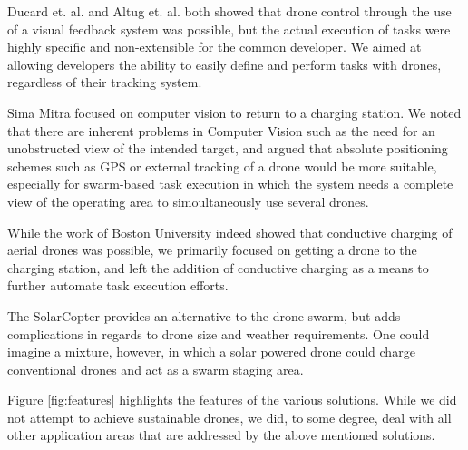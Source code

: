 Ducard et. al. and Altug et. al. both showed that drone control through the use of a visual feedback system was possible, but the actual execution of tasks were highly specific and non-extensible for the common developer. We aimed at allowing developers the ability to easily define and perform tasks with drones, regardless of their tracking system.

Sima Mitra focused on computer vision to return to a charging station. We noted that there are inherent problems in Computer Vision such as the need for an unobstructed view of the intended target, and argued that absolute positioning schemes such as GPS or external tracking of a drone would be more suitable, especially for swarm-based task execution in which the system needs a complete view of the operating area to simoultaneously use several drones.

While the work of Boston University indeed showed that conductive charging of aerial drones was possible, we primarily focused on getting a drone to the charging station, and left the addition of conductive charging as a means to further automate task execution efforts.

The SolarCopter provides an alternative to the drone swarm, but adds complications in regards to drone size and weather requirements. One could imagine a mixture, however, in which a solar powered drone could charge conventional drones and act as a swarm staging area.

Figure \ref{fig:features} highlights the features of the various solutions. While we did not attempt to achieve sustainable drones, we did, to some degree, deal with all other application areas that are addressed by the above mentioned solutions.

